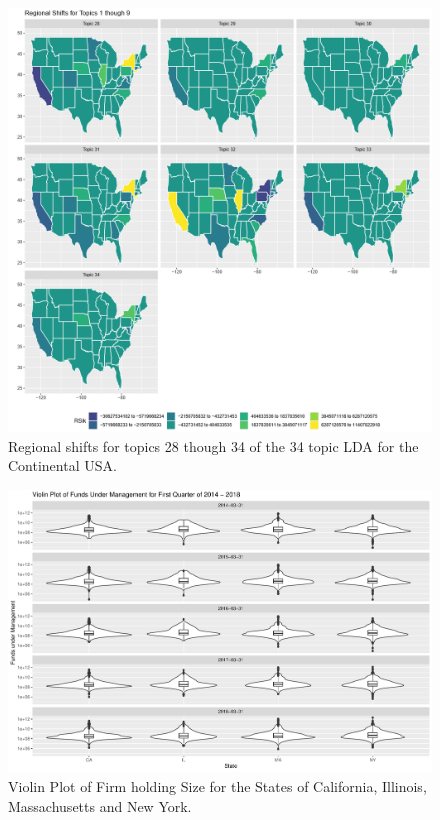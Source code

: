 \begin{figure}
	\centering
	\includegraphics[width=\linewidth]{Figures/ChapterV/States_28_34}
	\caption[Regional shifts using 34 Topic LDA, Topics 28 thought 34]{Regional shifts for topics 28 though 34 of the 34 topic LDA for the Continental USA.}
	\label{fig:shift-share_lda34-28-34}
\end{figure}


\begin{figure}
	\centering
	\includegraphics[width=1\linewidth]{Figures/ChapterV/Violinplot_q1}
	\caption[Violin Plot of Firm holding Size for CA, IL, MA and NY.]{Violin Plot of Firm holding Size for the States of California, Illinois, Massachusetts and New York.}
	\label{fig:violinplotq1}
\end{figure}




